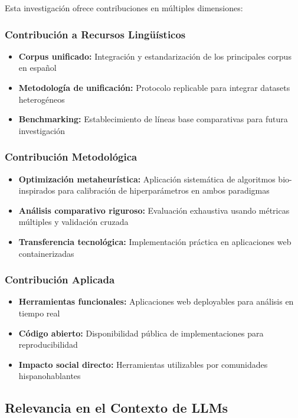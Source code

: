 Esta investigación ofrece contribuciones en múltiples dimensiones:

\subsubsection{Contribución a Recursos Lingüísticos}
\begin{itemize}
    \item \textbf{Corpus unificado:} Integración y estandarización de los principales corpus en español
    \item \textbf{Metodología de unificación:} Protocolo replicable para integrar datasets heterogéneos
    \item \textbf{Benchmarking:} Establecimiento de líneas base comparativas para futura investigación
\end{itemize}

\subsubsection{Contribución Metodológica}
\begin{itemize}
    \item \textbf{Optimización metaheurística:} Aplicación sistemática de algoritmos bio-inspirados para calibración de hiperparámetros en ambos paradigmas
    \item \textbf{Análisis comparativo riguroso:} Evaluación exhaustiva usando métricas múltiples y validación cruzada
    \item \textbf{Transferencia tecnológica:} Implementación práctica en aplicaciones web containerizadas
\end{itemize}

\subsubsection{Contribución Aplicada}
\begin{itemize}
    \item \textbf{Herramientas funcionales:} Aplicaciones web deployables para análisis en tiempo real
    \item \textbf{Código abierto:} Disponibilidad pública de implementaciones para reproducibilidad
    \item \textbf{Impacto social directo:} Herramientas utilizables por comunidades hispanohablantes
\end{itemize}

\subsection{Relevancia en el Contexto de LLMs}

